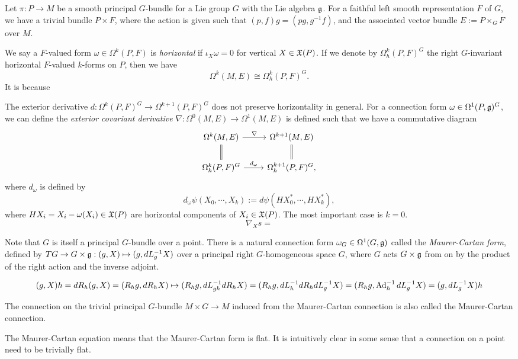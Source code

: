 \documentclass{../../large}
\begin{document}
\begin{prb}
Let $\pi:P\to M$ be a smooth principal $G$-bundle for a Lie group $G$ with the Lie algebra $\mathfrak{g}$.
For a faithful left smooth representation $F$ of $G$, we have a trivial bundle $P\times F$, where the action is given such that $(p,f)g=(pg,g^{-1}f)$, and the associated vector bundle $E:=P\times_GF$ over $M$.

We say a $F$-valued form $\omega\in\Omega^k(P,F)$ is \emph{horizontal} if $\iota_X\omega=0$ for vertical $X\in\mathfrak{X}(P)$.
If we denote by $\Omega_h^k(P,F)^G$ the right $G$-invariant horizontal $F$-valued $k$-forms on $P$, then we have
\[\Omega^k(M,E)\cong\Omega_h^k(P,F)^G.\]
It is because



The exterior derivative $d:\Omega^k(P,F)^G\to\Omega^{k+1}(P,F)^G$ does not preserve horizontality in general.
For a connection form $\omega\in\Omega^1(P,\mathfrak{g})^G$, we can define the \emph{exterior covariant derivative} $\nabla:\Omega^0(M,E)\to\Omega^1(M,E)$ is defined such that we have a commutative diagram
\[\begin{tikzcd}
\Omega^k(M,E) \rar{\nabla}\dar[equal] & \Omega^{k+1}(M,E)\dar[equal]\\
\Omega_h^k(P,F)^G \rar{d_\omega} & \Omega_h^{k+1}(P,F)^G,
\end{tikzcd}\]
where $d_\omega$ is defined by
\[d_\omega\psi(X_0,\cdots,X_k):=d\psi(HX_0^*,\cdots,HX_k^*),\]
where $HX_i=X_i-\omega(X_i)\in\mathfrak{X}(P)$ are horizontal components of $X_i\in\mathfrak{X}(P)$.
The most important case is $k=0$.
\[\nabla_Xs=\]
\end{prb}


\begin{prb}
Note that $G$ is itself a principal $G$-bundle over a point.
There is a natural connection form $\omega_G\in\Omega^1(G,\mathfrak{g})$ called the \emph{Maurer-Cartan form}, defined by
$TG\to G\times\mathfrak{g}:(g,X)\mapsto(g,dL_g^{-1}X)$ over a principal right $G$-homogeneous space $G$, where $G$ acts $G\times\mathfrak{g}$ from on by the product of the right action and the inverse adjoint.

\[(g,X)h=dR_h(g,X)=(R_hg,dR_hX)\mapsto(R_hg,dL_{gh}^{-1}dR_hX)=(R_hg,dL_h^{-1}dR_hdL_g^{-1}X)=(R_hg,\operatorname{Ad}_h^{-1}dL_g^{-1}X)=(g,dL_g^{-1}X)h\]


The connection on the trivial principal $G$-bundle $M\times G\to M$ induced from the Maurer-Cartan connection is also called the Maurer-Cartan connection.

The Maurer-Cartan equation means that the Maurer-Cartan form is flat.
It is intuitively clear in some sense that a connection on a point need to be trivially flat.
\end{prb}
\end{document}
